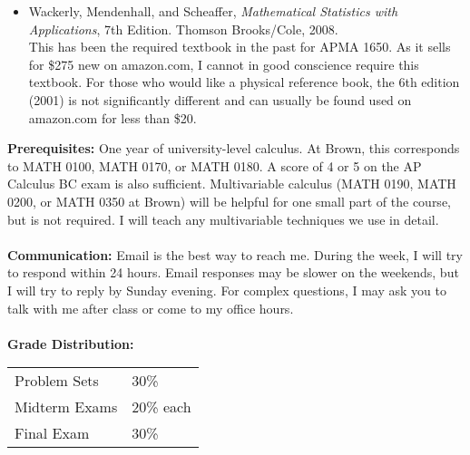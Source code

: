 \documentclass[11pt]{article}
\begin{document}
\begin{itemize}
\item Wackerly, Mendenhall, and Scheaffer, \emph{Mathematical Statistics with Applications}, 7th Edition. Thomson Brooks/Cole, 2008. \\

This has been the required textbook in the past for APMA 1650. As it sells for \$275 new on amazon.com, I cannot in good conscience require this textbook. For those who would like a physical reference book, the 6th edition (2001) is not significantly different and can usually be found used on amazon.com for less than \$20.
\end{itemize}
\textbf {Prerequisites:} One year of university-level calculus. At Brown, this corresponds to MATH 0100, MATH 0170, or MATH 0180. A score of 4 or 5 on the AP Calculus BC exam is also sufficient. Multivariable calculus (MATH 0190, MATH 0200, or MATH 0350 at Brown) will be helpful for one small part of the course, but is not required. I will teach any multivariable techniques we use in detail.\\\\
\textbf{Communication: }Email is the best way to reach me. During the week, I will try to respond within 24 hours. Email responses may be slower on the weekends, but I will try to reply by Sunday evening. For complex questions, I may ask you to talk with me after class or come to my office hours.
 \\\\
\textbf {Grade Distribution:} \\
\hspace*{40mm}
\begin{tabular}{ l l }
Problem Sets & 30\% \\
Midterm Exams  & 20\% each \\
Final Exam  & 30\%
\end{tabular} \\\\
\end{document}
